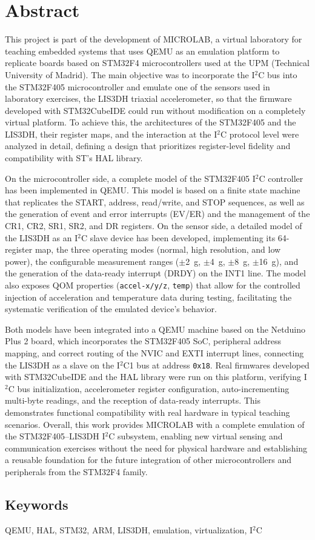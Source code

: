 \chapter*{Abstract}

This project is part of the development of MICROLAB, a virtual laboratory for 
teaching embedded systems that uses QEMU as an emulation platform to replicate 
boards based on STM32F4 microcontrollers used at the UPM (Technical University of 
Madrid). The main objective was to incorporate the I$^2$C bus into the STM32F405 
microcontroller and emulate one of the sensors used in laboratory exercises, the 
LIS3DH triaxial accelerometer, so that the firmware developed with STM32CubeIDE 
could run without modification on a completely virtual platform. To achieve this, 
the architectures of the STM32F405 and the LIS3DH, their register maps, and the 
interaction at the I$^2$C protocol level were analyzed in detail, defining a design 
that prioritizes register-level fidelity and compatibility with ST's HAL library.

On the microcontroller side, a complete model of the STM32F405 I$^2$C controller 
has been implemented in QEMU. This model is based on a 
finite state machine that replicates the START, address, read/write, and STOP 
sequences, as well as the generation of event and error interrupts (EV/ER) and the 
management of the CR1, CR2, SR1, SR2, and DR registers. On the sensor side, a 
detailed model of the LIS3DH as an I$^2$C slave device has been 
developed, implementing its 64-register map, the three operating modes (normal, high 
resolution, and low power), the configurable measurement ranges ($\pm$2~g, $\pm$4~g, 
$\pm$8~g, $\pm$16~g), and the generation of the data-ready interrupt (DRDY) on the 
INT1 line. The model also exposes QOM properties (\texttt{accel-x/y/z}, 
\texttt{temp}) that allow for the controlled injection of acceleration and 
temperature data during testing, facilitating the systematic verification of the 
emulated device's behavior.

Both models have been integrated into a QEMU machine based on the Netduino Plus 2 
board, which incorporates the STM32F405 SoC, peripheral address mapping, and correct 
routing of the NVIC and EXTI interrupt lines, connecting the LIS3DH as a slave on 
the I$^2$C1 bus at address \texttt{0x18}. Real firmwares developed with 
STM32CubeIDE and the HAL library were run on this platform, verifying I$^2$C bus 
initialization, accelerometer register configuration, auto-incrementing multi-byte 
readings, and the reception of data-ready interrupts. This demonstrates functional 
compatibility with real hardware in typical teaching scenarios. Overall, this work 
provides MICROLAB with a complete emulation of the STM32F405--LIS3DH I$^2$C 
subsystem, enabling new virtual sensing and communication exercises without the need 
for physical hardware and establishing a reusable foundation for the future 
integration of other microcontrollers and peripherals from the STM32F4 family.


\section*{Keywords}
QEMU, HAL, STM32, ARM, LIS3DH, emulation, virtualization, I$^2$C